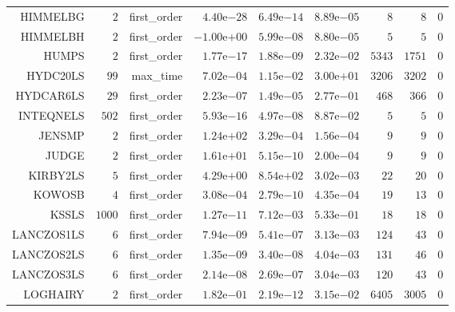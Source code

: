 \begin{longtable}{rrrrrrrrr}
HIMMELBG & \(     2\) & first\_order & \( 4.40\)e\(-28\) & \( 6.49\)e\(-14\) & \( 8.89\)e\(-05\) & \(     8\) & \(     8\) & \(     0\) \\
HIMMELBH & \(     2\) & first\_order & \(-1.00\)e\(+00\) & \( 5.99\)e\(-08\) & \( 8.80\)e\(-05\) & \(     5\) & \(     5\) & \(     0\) \\
HUMPS & \(     2\) & first\_order & \( 1.77\)e\(-17\) & \( 1.88\)e\(-09\) & \( 2.32\)e\(-02\) & \(  5343\) & \(  1751\) & \(     0\) \\
HYDC20LS & \(    99\) & max\_time & \( 7.02\)e\(-04\) & \( 1.15\)e\(-02\) & \( 3.00\)e\(+01\) & \(  3206\) & \(  3202\) & \(     0\) \\
HYDCAR6LS & \(    29\) & first\_order & \( 2.23\)e\(-07\) & \( 1.49\)e\(-05\) & \( 2.77\)e\(-01\) & \(   468\) & \(   366\) & \(     0\) \\
INTEQNELS & \(   502\) & first\_order & \( 5.93\)e\(-16\) & \( 4.97\)e\(-08\) & \( 8.87\)e\(-02\) & \(     5\) & \(     5\) & \(     0\) \\
JENSMP & \(     2\) & first\_order & \( 1.24\)e\(+02\) & \( 3.29\)e\(-04\) & \( 1.56\)e\(-04\) & \(     9\) & \(     9\) & \(     0\) \\
JUDGE & \(     2\) & first\_order & \( 1.61\)e\(+01\) & \( 5.15\)e\(-10\) & \( 2.00\)e\(-04\) & \(     9\) & \(     9\) & \(     0\) \\
KIRBY2LS & \(     5\) & first\_order & \( 4.29\)e\(+00\) & \( 8.54\)e\(+02\) & \( 3.02\)e\(-03\) & \(    22\) & \(    20\) & \(     0\) \\
KOWOSB & \(     4\) & first\_order & \( 3.08\)e\(-04\) & \( 2.79\)e\(-10\) & \( 4.35\)e\(-04\) & \(    19\) & \(    13\) & \(     0\) \\
KSSLS & \(  1000\) & first\_order & \( 1.27\)e\(-11\) & \( 7.12\)e\(-03\) & \( 5.33\)e\(-01\) & \(    18\) & \(    18\) & \(     0\) \\
LANCZOS1LS & \(     6\) & first\_order & \( 7.94\)e\(-09\) & \( 5.41\)e\(-07\) & \( 3.13\)e\(-03\) & \(   124\) & \(    43\) & \(     0\) \\
LANCZOS2LS & \(     6\) & first\_order & \( 1.35\)e\(-09\) & \( 3.40\)e\(-08\) & \( 4.04\)e\(-03\) & \(   131\) & \(    46\) & \(     0\) \\
LANCZOS3LS & \(     6\) & first\_order & \( 2.14\)e\(-08\) & \( 2.69\)e\(-07\) & \( 3.04\)e\(-03\) & \(   120\) & \(    43\) & \(     0\) \\
LOGHAIRY & \(     2\) & first\_order & \( 1.82\)e\(-01\) & \( 2.19\)e\(-12\) & \( 3.15\)e\(-02\) & \(  6405\) & \(  3005\) & \(     0\) \\

\end{longtable}

